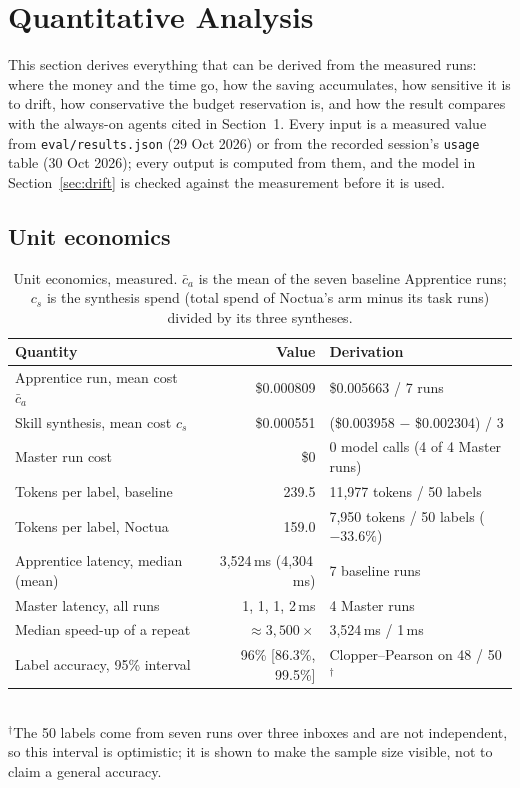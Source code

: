 \documentclass[11pt]{article}
\newcommand{\code}[1]{\texttt{#1}}
\begin{document}
\section{Quantitative Analysis}\label{sec:quant}

This section derives everything that can be derived from the measured runs: where the money and the time go,
how the saving accumulates, how sensitive it is to drift, how conservative the budget reservation is, and how the
result compares with the always-on agents cited in Section~1. Every input is a measured value from
\code{eval/results.json} (29 Oct 2026) or from the recorded session's \code{usage} table (30 Oct 2026); every output
is computed from them, and the model in Section~\ref{sec:drift} is checked against the measurement before it is used.

\subsection{Unit economics}

\begin{table}[!htbp]
\centering\small
\caption{Unit economics, measured. $\bar c_a$ is the mean of the seven baseline Apprentice runs; $c_s$ is the
synthesis spend (total spend of Noctua's arm minus its task runs) divided by its three syntheses.}
\label{tab:unit}
\begin{tabular}{lrl}
\toprule
Quantity & Value & Derivation\\
\midrule
Apprentice run, mean cost $\bar c_a$ & \$0.000809 & \$0.005663 / 7 runs\\
Skill synthesis, mean cost $c_s$ & \$0.000551 & (\$0.003958 $-$ \$0.002304) / 3\\
Master run cost & \$0 & 0 model calls (4 of 4 Master runs)\\
Tokens per label, baseline & 239.5 & 11{,}977 tokens / 50 labels\\
Tokens per label, Noctua & 159.0 & 7{,}950 tokens / 50 labels ($-33.6\%$)\\
Apprentice latency, median (mean) & 3{,}524\,ms (4{,}304\,ms) & 7 baseline runs\\
Master latency, all runs & 1, 1, 1, 2\,ms & 4 Master runs\\
Median speed-up of a repeat & $\approx 3{,}500\times$ & 3{,}524\,ms / 1\,ms\\
Label accuracy, 95\% interval & 96\% [86.3\%, 99.5\%] & Clopper--Pearson on 48 / 50$^\dagger$\\
\bottomrule
\end{tabular}
\\[2pt]{\footnotesize $^\dagger$The 50 labels come from seven runs over three inboxes and are not independent, so
this interval is optimistic; it is shown to make the sample size visible, not to claim a general accuracy.}
\end{table}
\end{document}
